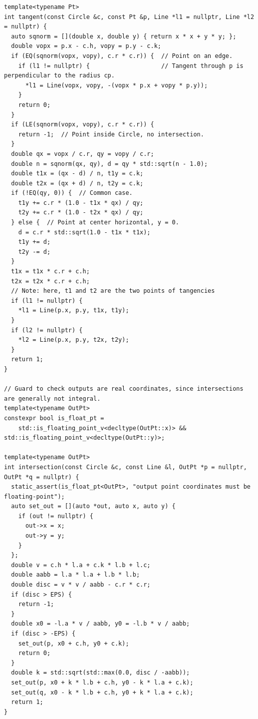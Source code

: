 \begin{lstlisting}[style=cpp]
template<typename Pt>
int tangent(const Circle &c, const Pt &p, Line *l1 = nullptr, Line *l2 = nullptr) {
  auto sqnorm = [](double x, double y) { return x * x + y * y; };
  double vopx = p.x - c.h, vopy = p.y - c.k;
  if (EQ(sqnorm(vopx, vopy), c.r * c.r)) {  // Point on an edge.
    if (l1 != nullptr) {                    // Tangent through p is perpendicular to the radius cp.
      *l1 = Line(vopx, vopy, -(vopx * p.x + vopy * p.y));
    }
    return 0;
  }
  if (LE(sqnorm(vopx, vopy), c.r * c.r)) {
    return -1;  // Point inside Circle, no intersection.
  }
  double qx = vopx / c.r, qy = vopy / c.r;
  double n = sqnorm(qx, qy), d = qy * std::sqrt(n - 1.0);
  double t1x = (qx - d) / n, t1y = c.k;
  double t2x = (qx + d) / n, t2y = c.k;
  if (!EQ(qy, 0)) {  // Common case.
    t1y += c.r * (1.0 - t1x * qx) / qy;
    t2y += c.r * (1.0 - t2x * qx) / qy;
  } else {  // Point at center horizontal, y = 0.
    d = c.r * std::sqrt(1.0 - t1x * t1x);
    t1y += d;
    t2y -= d;
  }
  t1x = t1x * c.r + c.h;
  t2x = t2x * c.r + c.h;
  // Note: here, t1 and t2 are the two points of tangencies
  if (l1 != nullptr) {
    *l1 = Line(p.x, p.y, t1x, t1y);
  }
  if (l2 != nullptr) {
    *l2 = Line(p.x, p.y, t2x, t2y);
  }
  return 1;
}

// Guard to check outputs are real coordinates, since intersections are generally not integral.
template<typename OutPt>
constexpr bool is_float_pt =
    std::is_floating_point_v<decltype(OutPt::x)> && std::is_floating_point_v<decltype(OutPt::y)>;

template<typename OutPt>
int intersection(const Circle &c, const Line &l, OutPt *p = nullptr, OutPt *q = nullptr) {
  static_assert(is_float_pt<OutPt>, "output point coordinates must be floating-point");
  auto set_out = [](auto *out, auto x, auto y) {
    if (out != nullptr) {
      out->x = x;
      out->y = y;
    }
  };
  double v = c.h * l.a + c.k * l.b + l.c;
  double aabb = l.a * l.a + l.b * l.b;
  double disc = v * v / aabb - c.r * c.r;
  if (disc > EPS) {
    return -1;
  }
  double x0 = -l.a * v / aabb, y0 = -l.b * v / aabb;
  if (disc > -EPS) {
    set_out(p, x0 + c.h, y0 + c.k);
    return 0;
  }
  double k = std::sqrt(std::max(0.0, disc / -aabb));
  set_out(p, x0 + k * l.b + c.h, y0 - k * l.a + c.k);
  set_out(q, x0 - k * l.b + c.h, y0 + k * l.a + c.k);
  return 1;
}


\end{lstlisting}
